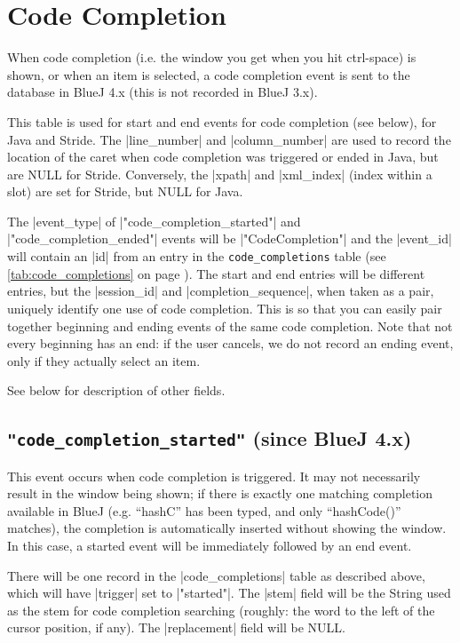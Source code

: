 \documentclass{report}
\newcommand{\myref}[1]{\autoref{#1} on page \pageref*{#1}}
\newcommand{\tabref}[1]{\lstinline|#1| table (see \myref{tab:#1})}
\begin{document}
\section{Code Completion}

When code completion (i.e. the window you get when you hit ctrl-space) is shown, or when an item is selected,
a code completion event is sent to the database in BlueJ 4.x (this is not recorded in BlueJ 3.x).


This table is used for start and end events for code completion (see below), for Java and Stride.  The
|line_number| and |column_number| are used to record the location of the caret when code completion was triggered or ended in Java,
but are NULL for Stride.  Conversely, the |xpath| and |xml_index| (index within a slot) are set for Stride, but NULL for Java.

The |event_type| of |"code_completion_started"| and |"code_completion_ended"| events will be |"CodeCompletion"| and the |event_id|
will contain an |id| from an entry in the \tabref{code_completions}.  The start and end
entries will be different entries, but the |session_id| and |completion_sequence|, when taken as a pair, uniquely identify one use of code completion.  This is so
that you can easily pair together beginning and ending events of the same code completion.  Note that not every beginning
has an end: if the user cancels, we do not record an ending event, only if they actually select an item.

See below for description of other fields.

\subsection{\lstinline!"code_completion_started"! (since BlueJ 4.x)}

This event occurs when code completion is triggered.  It may not necessarily result in the window being shown;
if there is exactly one matching completion available in BlueJ (e.g. ``hashC'' has been typed, and only ``hashCode()'' matches),
the completion is automatically inserted without showing the window.  In this case, a started event will be immediately
followed by an end event.

There will be one record in the |code_completions| table as described above, which will have |trigger| set to |"started"|.  The |stem| field
will be the String used as the stem for code completion searching (roughly: the word to the left of the cursor position, if any).
The |replacement| field will be NULL.
\end{document}
